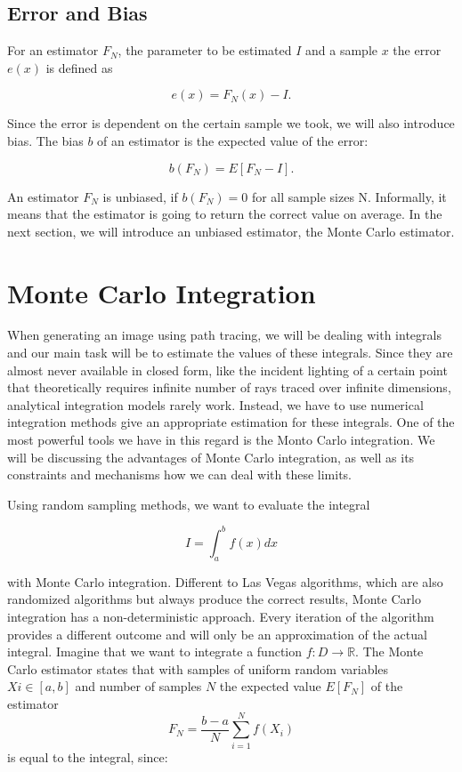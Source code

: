 \subsection{Error and Bias} 

For an estimator $F_N$, the parameter to be estimated $I$ and a sample $x$ the error $e(x)$ is defined as

\begin{equation}
e(x) = F_N(x) - I.
\end{equation}

Since the error is dependent on the certain sample we took, we will also introduce bias. The bias $b$ of an estimator is the expected value of the error:

\begin{equation}
b(F_N) = E[F_N - I].
\end{equation}

An estimator $F_N$ is unbiased, if $b(F_N) = 0$ for all sample sizes N. Informally, it means that the estimator is going to return the correct value on average. In the next section, we will introduce an unbiased estimator, the Monte Carlo estimator.

\section{Monte Carlo Integration}
\label{ch:preliminaries:mci}

When generating an image using path tracing, we will be dealing with integrals and our main task will be to estimate the values of these integrals. Since they are almost never available in closed form, like the incident lighting of a certain point that theoretically requires infinite number of rays traced over infinite dimensions, analytical integration models rarely work. Instead, we have to use numerical integration methods give an appropriate estimation for these integrals. One of the most powerful tools we have in this regard is the Monto Carlo integration. We will be discussing the advantages of Monte Carlo integration, as well as its constraints and mechanisms how we can deal with these limits.

Using random sampling methods, we want to evaluate the integral 

\begin{equation}
I = \int_{a}^{b}f(x)dx
\end{equation}

with Monte Carlo integration. Different to Las Vegas algorithms, which are also randomized algorithms but always produce the correct results, Monte Carlo integration has a non-deterministic approach. Every iteration of the algorithm provides a different outcome and will only be an approximation of the actual integral. Imagine that we want to integrate a function $f:D \rightarrow \mathbb{R}$. The Monte Carlo estimator states that with samples of uniform random variables $Xi \in [a,b]$ and number of samples $N$ the expected value $E[F_N]$ of the estimator 
\begin{equation}
F_N = \frac{b-a}{N}\sum_{i = 1}^{N}f(X_i)
\end{equation}
is equal to the integral, since:

